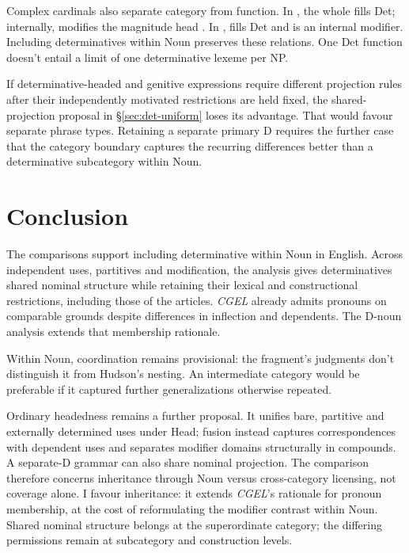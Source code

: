 \documentclass[12pt]{article}
\begin{document}
Complex cardinals also separate category from function. In , the whole  fills Det; internally,  modifies the magnitude head  \citep[§4]{reynolds2026numerals}. In ,  fills Det and  is an internal modifier. Including determinatives within Noun preserves these relations. One Det function doesn't entail a limit of one determinative lexeme per NP.

If determinative-headed and genitive expressions require different projection rules after their independently motivated restrictions are held fixed, the shared-projection proposal in §\ref{sec:det-uniform} loses its advantage. That would favour separate phrase types. Retaining a separate primary D requires the further case that the category boundary captures the recurring differences better than a determinative subcategory within Noun.

\section{Conclusion}\label{sec:conclusion}

The comparisons support including determinative within Noun in English. Across independent uses, partitives and modification, the analysis gives determinatives shared nominal structure while retaining their lexical and constructional restrictions, including those of the articles. \textit{CGEL} already admits pronouns on comparable grounds despite differences in inflection and dependents. The D-noun analysis extends that membership rationale.

Within Noun, coordination remains provisional: the fragment's judgments don't distinguish it from Hudson's nesting. An intermediate category would be preferable if it captured further generalizations otherwise repeated.

Ordinary headedness remains a further proposal. It unifies bare, partitive and externally determined uses under Head; fusion instead captures correspondences with dependent uses and separates modifier domains structurally in compounds. A separate-D grammar can also share nominal projection. The comparison therefore concerns inheritance through Noun versus cross-category licensing, not coverage alone. I favour inheritance: it extends \textit{CGEL}'s rationale for pronoun membership, at the cost of reformulating the modifier contrast within Noun. Shared nominal structure belongs at the superordinate category; the differing permissions remain at subcategory and construction levels.
\end{document}
